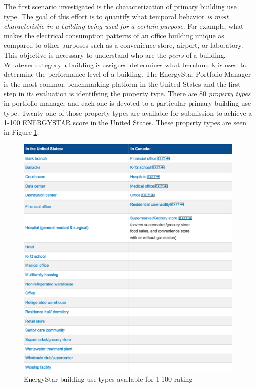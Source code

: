 The first scenario investigated is the characterization of primary building use type. The goal of this effort is to quantify what temporal behavior \emph{is most characteristic in a building being used for a certain purpose}. For example, what makes the electrical consumption patterns of an office building unique as compared to other purposes such as a convenience store, airport, or laboratory. This objective is necessary to understand who are the \emph{peers} of a building. Whatever category a building is assigned determines what benchmark is used to determine the performance level of a building. The EnergyStar Portfolio Manager is the most common benchmarking platform in the United States and the first step in its evaluation is identifying the property type. There are 80 \emph{property types} in portfolio manager and each one is devoted to a particular primary building use type. Twenty-one of those property types are available for submission to achieve a 1-100 ENERGYSTAR score in the United States. These property types are seen in Figure \ref{fig:energystarbuildings}.

\begin{figure}[ht!]
\begin{center}
\includegraphics[width=0.7\columnwidth]{figures/enegystar_buildingtypes/enegystar_buildingtypes}
\caption{{EnergyStar building use-types available for 1-100 rating
\label{fig:energystarbuildings}%
}}
\end{center}
\end{figure}

